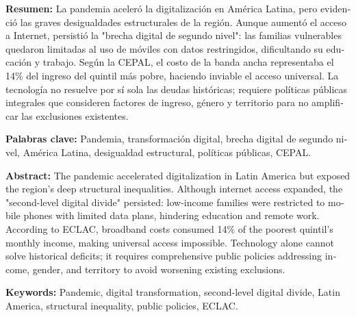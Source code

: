 \documentclass{article}
\begin{document}
\begin{tcolorbox}[colback=brown!8!white,colframe=brown!8!white,boxrule=0pt,arc=2pt,left=4pt,right=4pt,top=3pt,bottom=3pt,before skip=4pt,after skip=4pt]
\begin{otherlanguage}{spanish}
\sffamily\small \textbf{Resumen:} La pandemia aceleró la digitalización en América Latina, pero evidenció las graves desigualdades estructurales de la región. Aunque aumentó el acceso a Internet, persistió la "brecha digital de segundo nivel": las familias vulnerables quedaron limitadas al uso de móviles con datos restringidos, dificultando su educación y trabajo. Según la CEPAL, el costo de la banda ancha representaba el 14\% del ingreso del quintil más pobre, haciendo inviable el acceso universal. La tecnología no resuelve por sí sola las deudas históricas; requiere políticas públicas integrales que consideren factores de ingreso, género y territorio para no amplificar las exclusiones existentes.
\par\smallskip\noindent\textbf{Palabras clave:} Pandemia, transformación digital, brecha digital de segundo nivel, América Latina, desigualdad estructural, políticas públicas, CEPAL.
\end{otherlanguage}
\end{tcolorbox}

\begin{tcolorbox}[colback=brown!8!white,colframe=brown!8!white,boxrule=0pt,arc=2pt,left=4pt,right=4pt,top=3pt,bottom=3pt,before skip=4pt,after skip=4pt]
\begin{otherlanguage}{english}
\sffamily\small \textbf{Abstract:} The pandemic accelerated digitalization in Latin America but exposed the region's deep structural inequalities. Although internet access expanded, the "second-level digital divide" persisted: low-income families were restricted to mobile phones with limited data plans, hindering education and remote work. According to ECLAC, broadband costs consumed 14\% of the poorest quintil's monthly income, making universal access impossible. Technology alone cannot solve historical deficits; it requires comprehensive public policies addressing income, gender, and territory to avoid worsening existing exclusions.
\par\smallskip\noindent\textbf{Keywords:} Pandemic, digital transformation, second-level digital divide, Latin America, structural inequality, public policies, ECLAC.
\end{otherlanguage}
\end{tcolorbox}
\end{document}

